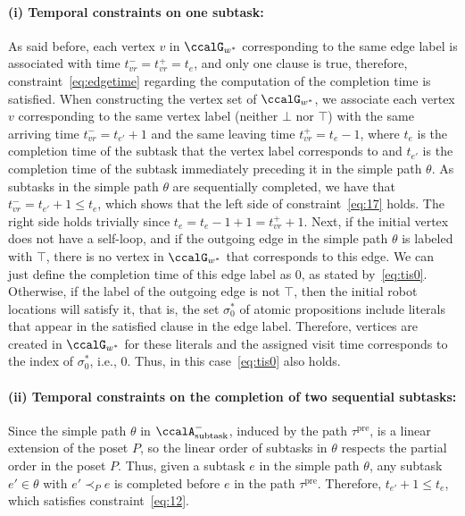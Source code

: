 \documentclass[Afour,sageh,times]{sagej}
\newcommand{\auto}[1]{\ccalA_{\textup{#1}}}
\begin{document}
{{\paragraph{(i) Temporal constraints on one subtask:} As said before, each vertex $v$ in $\ccalG_{w^*}$ corresponding to the same edge label is associated with time $t_{vr}^- = t_{vr}^+ = t_e$, and only one clause is true, therefore, constraint~\eqref{eq:edgetime} regarding the computation of the completion time is satisfied. When constructing the vertex set of $\ccalG_{w^*}$, we associate each vertex $v$ corresponding to the same vertex label (neither $\bot$ nor $\top$) with the same arriving time $t_{vr}^- = t_{e'}+1$ and the same leaving time $t_{vr}^+ = t_{e}-1$, where $t_e$ is the completion time of the subtask that the vertex label corresponds to and $t_{e'}$ is the completion time of the subtask immediately preceding it in the simple path $\theta$. As subtasks in  the simple path $\theta$ are sequentially completed, we have that $t_{vr}^- = t_{e'}+1\leq t_e$, which shows that the left side of constraint~\eqref{eq:17} holds. The right side holds trivially since $t_e = t_e-1+1 = t_{vr}^+ +1$. Next, if the initial vertex does not have a self-loop, and if the outgoing edge in the simple path $\theta$ is labeled with $\top$, there is no vertex in $\ccalG_{w^*}$ that corresponds to this edge. We can just define the completion time of this edge label as 0, as stated by~\eqref{eq:tis0}. Otherwise, if the label of the outgoing edge is not $\top$, then the initial robot locations will satisfy it, that is, the set $\sigma^*_0$ of atomic propositions include literals that appear in the satisfied clause in the edge label.
Therefore, vertices are created in $\ccalG_{w^*}$ for these literals and the assigned visit time corresponds to the index of $\sigma_0^*$, i.e., 0. Thus, in this case~\eqref{eq:tis0} also holds.

\paragraph{(ii) Temporal constraints on the completion of two sequential subtasks:}
Since the simple path $\theta$ in $\auto{subtask}^-$, induced by the path $\tau^\text{pre}$, is a linear extension of the poset $P$, so the linear order of subtasks in $\theta$ respects the partial order in the poset $P$. Thus, given a subtask $e$ in the simple path $\theta$, any subtask $e'\in \theta$ with $e' \prec_P e$ is completed before $e$ in the path $\tau^\text{pre}$. Therefore, $t_{e'} +1 \leq t_e$, which satisfies constraint~\eqref{eq:12}.
}}
\end{document}
